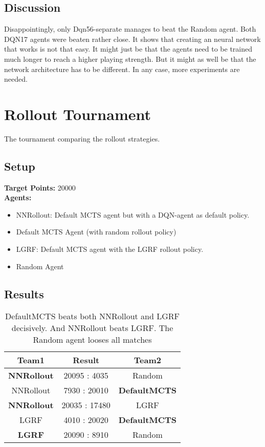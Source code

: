\subsection*{Discussion}
Disappointingly, only Dqn56-separate manages to beat the Random agent. Both DQN17 agents were beaten rather close.
It shows that creating an neural network that works is not that easy.
It might just be that the agents need to be trained much longer to reach a higher playing strength. But it might as well be that the network architecture has to be different.
In any case, more experiments are needed.

\section{Rollout Tournament}
The tournament comparing the rollout strategies.
\subsection*{Setup}
\textbf{Target Points:} 20000\\
\textbf{Agents:}
\begin{itemize}
    \setlength\itemsep{2px}
    \item NNRollout: Default MCTS agent but with a DQN-agent as default policy.
    \item Default MCTS Agent (with random rollout policy)
    \item LGRF: Default MCTS agent with the LGRF rollout policy.
    \item Random Agent
\end{itemize}

\subsection*{Results}
\begin{table}[h!]
  \centering

  \begin{tabular}{ccc}
    \textbf{Team1} & \textbf{Result}  & \textbf{Team2}\\
    \hline
    \textbf{NNRollout} & 20095 : 4035 & Random\\
    \hline
    NNRollout &  7930 : 20010 & \textbf{DefaultMCTS} \\
    \hline
    \textbf{NNRollout} & 20035 : 17480 & LGRF \\
    \hline
    LGRF & 4010 : 20020  & \textbf{DefaultMCTS} \\
    \hline
    \textbf{LGRF} & 20090 : 8910  & Random \\
    \hline
  \end{tabular}
  \caption[Result of the Rollout Tournament]{DefaultMCTS beats both NNRollout and LGRF decisively. And NNRollout beats LGRF. The Random agent looses all matches}
\end{table}

